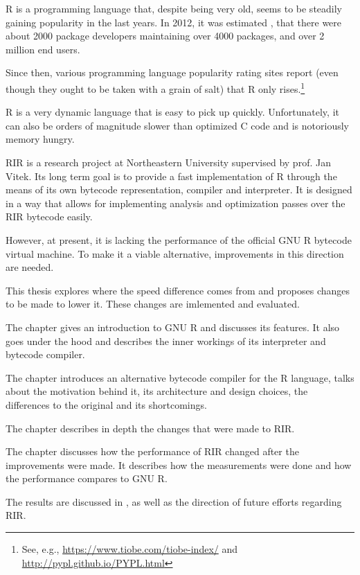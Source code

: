 R is a programming language that, despite being very old, seems to be steadily gaining popularity in the last years. In 2012, it was estimated \autocite{design}, that there were about 2000 package developers maintaining over 4000 packages, and over 2 million end users.

Since then, various programming language popularity rating sites report (even though they ought to be taken with a grain of salt) that R only rises.\footnote{See, e.g., \url{https://www.tiobe.com/tiobe-index/} and \url{http://pypl.github.io/PYPL.html}}

R is a very dynamic language that is easy to pick up quickly. Unfortunately, it can also be orders of magnitude slower than optimized C code and is notoriously memory hungry.

RIR is a research project at Northeastern University supervised by prof. Jan Vitek. Its long term goal is to provide a fast implementation of R through the means of its own bytecode representation, compiler and interpreter. It is designed in a way that allows for implementing analysis and optimization passes over the RIR bytecode easily.

However, at present, it is lacking the performance of the official GNU R bytecode virtual machine. To make it a viable alternative, improvements in this direction are needed.

This thesis explores where the speed difference comes from and proposes changes to be made to lower it. These changes are imlemented and evaluated.

The chapter \emph{} gives an introduction to GNU R and discusses its features. It also goes under the hood and describes the inner workings of its interpreter and bytecode compiler.

The chapter \emph{} introduces an alternative bytecode compiler for the R language, talks about the motivation behind it, its architecture and design choices, the differences to the original and its shortcomings.

The chapter \emph{} describes in depth the changes that were made to RIR.

The chapter \emph{} discusses how the performance of RIR changed after the improvements were made. It describes how the measurements were done and how the performance compares to GNU R.

The results are discussed in \emph{}, as well as the direction of future efforts regarding RIR.
